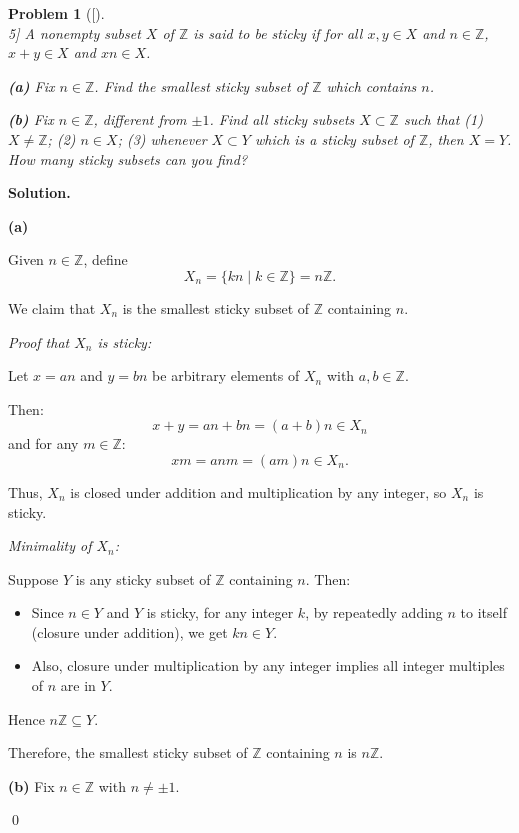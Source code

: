 \documentclass[12pt]{article}
\newtheorem{problemx}{Problem}
\newenvironment{problem}[1]{%
	\begin{problemx}[#1]\leavevmode\\[0.5em] %
	}{%
	\end{problemx}
}
\newenvironment{solution}{%
	\par\medskip
	\noindent\textbf{Solution.}\par\nopagebreak
}{%
	\hfill \qed \par\medskip
}
\begin{document}
\begin{problem}[5]
	A nonempty subset $X$ of $\mathbb{Z}$ is said to be \textit{sticky} if for all $x, y \in X$ and $n \in \mathbb{Z}$, $x + y \in X$ and $xn \in X$.
	
	\textbf{(a)} Fix $n \in \mathbb{Z}$. Find the smallest sticky subset of $\mathbb{Z}$ which contains $n$.
	
	\textbf{(b)} Fix $n \in \mathbb{Z}$, different from $\pm1$. Find all sticky subsets $X \subset \mathbb{Z}$ such that (1) $X \neq \mathbb{Z}$; (2) $n \in X$; (3) whenever $X \subset Y$ which is a sticky subset of $\mathbb{Z}$, then $X = Y$. How many sticky subsets can you find? 
\end{problem}

\begin{solution}
	
	\textbf{(a)}
	
	Given $n \in \mathbb{Z}$, define 
	\[
	X_n = \{ k n \mid k \in \mathbb{Z} \} = n \mathbb{Z}.
	\]
	
	We claim that $X_n$ is the smallest sticky subset of $\mathbb{Z}$ containing $n$.
	
	\textit{Proof that $X_n$ is sticky:}
	
	Let $x = a n$ and $y = b n$ be arbitrary elements of $X_n$ with $a, b \in \mathbb{Z}$.
	
	Then:
	\[
	x + y = a n + b n = (a + b) n \in X_n
	\]
	and for any $m \in \mathbb{Z}$:
	\[
	x m = a n m = (a m) n \in X_n.
	\]
	
	Thus, $X_n$ is closed under addition and multiplication by any integer, so $X_n$ is sticky.
	
	\textit{Minimality of $X_n$:}
	
	Suppose $Y$ is any sticky subset of $\mathbb{Z}$ containing $n$. Then:
	
	\begin{itemize}
		\item Since $n \in Y$ and $Y$ is sticky, for any integer $k$, by repeatedly adding $n$ to itself (closure under addition), we get $k n \in Y$.
		\item Also, closure under multiplication by any integer implies all integer multiples of $n$ are in $Y$.
	\end{itemize}
	
	Hence $n \mathbb{Z} \subseteq Y$.
	
	Therefore, the smallest sticky subset of $\mathbb{Z}$ containing $n$ is $n \mathbb{Z}$.

\textbf{(b)} Fix $n \in \mathbb{Z}$ with $n \ne \pm 1$.


\end{solution}
\end{document}
